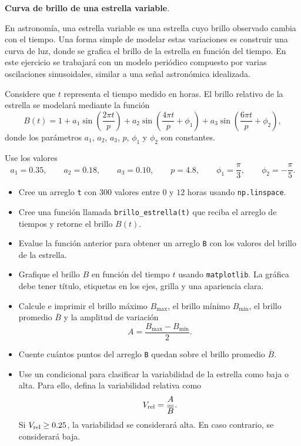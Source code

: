 \providecommand{\Needspace}[1]{}
\Needspace{8\baselineskip}
\item \textbf{Curva de brillo de una estrella variable}.
\nopagebreak[4]

\begin{tcolorbox}[colback=blue!2!white,colframe=blue!55!black,title={Enunciado},breakable]
En astronomía, una estrella variable es una estrella cuyo brillo observado cambia con el tiempo. Una forma simple de modelar estas variaciones es construir una curva de luz, donde se grafica el brillo de la estrella en función del tiempo. En este ejercicio se trabajará con un modelo periódico compuesto por varias oscilaciones sinusoidales, similar a una señal astronómica idealizada.

Considere que $t$ representa el tiempo medido en horas. El brillo relativo de la estrella se modelará mediante la función
\[
B(t)
=
1
+
a_1 \sin\left(\frac{2\pi t}{p}\right)
+
a_2 \sin\left(\frac{4\pi t}{p}+\phi_1\right)
+
a_3 \sin\left(\frac{6\pi t}{p}+\phi_2\right),
\]
donde los parámetros $a_1$, $a_2$, $a_3$, $p$, $\phi_1$ y $\phi_2$ son constantes.

Use los valores
\[
a_1 = 0.35, 
\qquad 
a_2 = 0.18,
\qquad 
a_3 = 0.10,
\qquad
p = 4.8,
\qquad
\phi_1 = \frac{\pi}{3},
\qquad
\phi_2 = -\frac{\pi}{5}.
\]

\begin{itemize}
    \item[(a)] Cree un arreglo \texttt{t} con $300$ valores entre $0$ y $12$ horas usando \texttt{np.linspace}.
    
    \item[(b)] Cree una función llamada \texttt{brillo\_estrella(t)} que reciba el arreglo de tiempos y retorne el brillo $B(t)$.
    
    \item[(c)] Evalue la función anterior para obtener un arreglo \texttt{B} con los valores del brillo de la estrella.
    
    \item[(d)] Grafique el brillo $B$ en función del tiempo $t$ usando \texttt{matplotlib}. La gráfica debe tener título, etiquetas en los ejes, grilla y una apariencia clara.
    
    \item[(e)] Calcule e imprimir el brillo máximo $B_{\max}$, el brillo mínimo $B_{\min}$, el brillo promedio $\overline{B}$ y la amplitud de variación
    \[
    A = \frac{B_{\max}-B_{\min}}{2}.
    \]
    
    \item[(f)] Cuente cuántos puntos del arreglo \texttt{B} quedan sobre el brillo promedio $\overline{B}$.
    
    \item[(g)] Use un condicional para clasificar la variabilidad de la estrella como baja o alta. Para ello, defina la variabilidad relativa como
    \[
    V_{\rm rel}=\frac{A}{\overline{B}}.
    \]
    Si $V_{\rm rel} \geq 0.25$, la variabilidad se considerará alta. En caso contrario, se considerará baja.
\end{itemize}
\end{tcolorbox}

